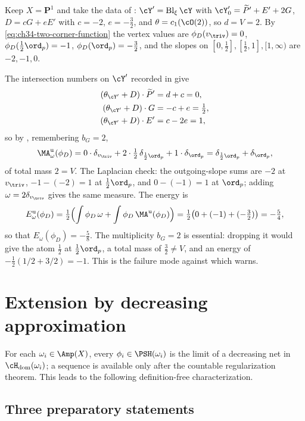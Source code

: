 \begin{example}
\label{ex:ch46-p1-two-corner}
Keep $X=\mathbf P^1$ and take the data of :
$\cY'=\operatorname{Bl}_\xi\cY$ with $\cY'_0=\widetilde P'+E'+2G$,
$D=cG+eE'$ with $c=-2$, $e=-\tfrac32$, and $\theta=c_1(\cO(2))$,
so $d=V=2$.  By \eqref{eq:ch34-two-corner-function} the vertex values are
$\phi_D(v_{\triv})=0$, $\phi_D(\tfrac12\ord_p)=-1$,
$\phi_D(\ord_p)=-\tfrac32$, and the slopes on
$[0,\tfrac12],[\tfrac12,1],[1,\infty)$ are $-2,-1,0$.

The intersection numbers on $\cY'$ recorded in
 give
\[
 \begin{aligned}
  (\theta_{\cY'}+D)\cdot\widetilde P'&=d+c=0,\\
  (\theta_{\cY'}+D)\cdot G&=-c+e=\tfrac12,\\
  (\theta_{\cY'}+D)\cdot E'&=c-2e=1,
 \end{aligned}
\]
so by , remembering $b_G=2$,
\[
 \MA^{\mathrm u}_\omega(\phi_D)
 =0\cdot\delta_{v_{\triv}}
  +2\cdot\tfrac12\,\delta_{\frac12\ord_p}
  +1\cdot\delta_{\ord_p}
 =\delta_{\frac12\ord_p}+\delta_{\ord_p},
\]
of total mass $2=V$.  The Laplacian check: the outgoing-slope sums are
$-2$ at $v_{\triv}$, $-1-(-2)=1$ at $\tfrac12\ord_p$, and
$0-(-1)=1$ at $\ord_p$; adding $\omega=2\delta_{v_{\triv}}$ gives the
same measure.  The energy is
\[
 E^{\mathrm u}_\omega(\phi_D)
 =\tfrac12\Bigl(\int\phi_D\,\omega+\int\phi_D\,\MA^{\mathrm u}(\phi_D)\Bigr)
 =\tfrac12\bigl(0+(-1)+(-\tfrac32)\bigr)=-\tfrac54,
\]
so that $E_\omega(\phi_D)=-\tfrac58$.
The multiplicity $b_G=2$ is essential: dropping it would give the atom
$\tfrac12$ at $\tfrac12\ord_p$, a total mass of $\tfrac32\ne V$, and
an energy of $-\tfrac12(1/2+3/2)=-1$.  This is the failure mode against
which  warns.
\end{example}

\section{Extension by decreasing approximation}
\label{sec:ch46-extension}

For each $\omega_i\in\Amp(X)$, every
$\phi_i\in\PSH(\omega_i)$ is the limit of a decreasing net in
$\cH_{\mathrm{dom}}(\omega_i)$; a sequence is available only after the countable
regularization theorem.  This leads to the following definition-free
characterization.

\subsection{Three preparatory statements}
\label{sec:ch46-preparation}

